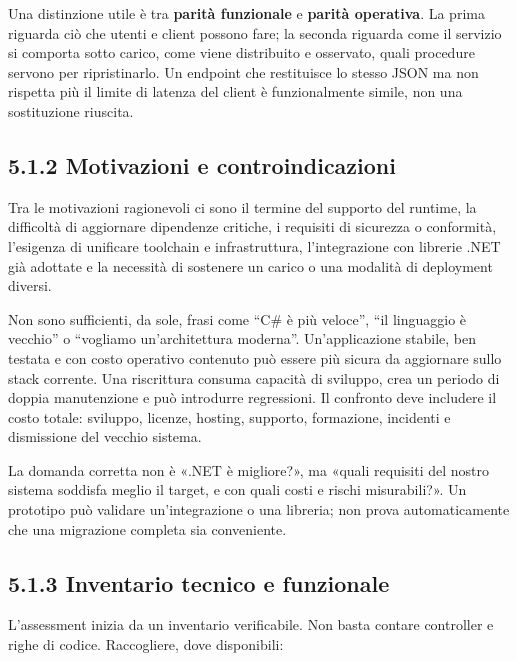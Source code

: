 \documentclass[
  italian,
  10pt,
]{book}
\begin{document}
Una distinzione utile è tra \textbf{parità funzionale} e \textbf{parità
operativa}. La prima riguarda ciò che utenti e client possono fare; la
seconda riguarda come il servizio si comporta sotto carico, come viene
distribuito e osservato, quali procedure servono per ripristinarlo. Un
endpoint che restituisce lo stesso JSON ma non rispetta più il limite di
latenza del client è funzionalmente simile, non una sostituzione
riuscita.

\subsection{5.1.2 Motivazioni e
controindicazioni}\label{motivazioni-e-controindicazioni}

Tra le motivazioni ragionevoli ci sono il termine del supporto del
runtime, la difficoltà di aggiornare dipendenze critiche, i requisiti di
sicurezza o conformità, l'esigenza di unificare toolchain e
infrastruttura, l'integrazione con librerie .NET già adottate e la
necessità di sostenere un carico o una modalità di deployment diversi.

Non sono sufficienti, da sole, frasi come ``C\# è più veloce'', ``il
linguaggio è vecchio'' o ``vogliamo un'architettura moderna''.
Un'applicazione stabile, ben testata e con costo operativo contenuto può
essere più sicura da aggiornare sullo stack corrente. Una riscrittura
consuma capacità di sviluppo, crea un periodo di doppia manutenzione e
può introdurre regressioni. Il confronto deve includere il costo totale:
sviluppo, licenze, hosting, supporto, formazione, incidenti e
dismissione del vecchio sistema.

La domanda corretta non è «.NET è migliore?», ma «quali requisiti del
nostro sistema soddisfa meglio il target, e con quali costi e rischi
misurabili?». Un prototipo può validare un'integrazione o una libreria;
non prova automaticamente che una migrazione completa sia conveniente.

\subsection{5.1.3 Inventario tecnico e
funzionale}\label{inventario-tecnico-e-funzionale}

L'assessment inizia da un inventario verificabile. Non basta contare
controller e righe di codice. Raccogliere, dove disponibili:
\end{document}
